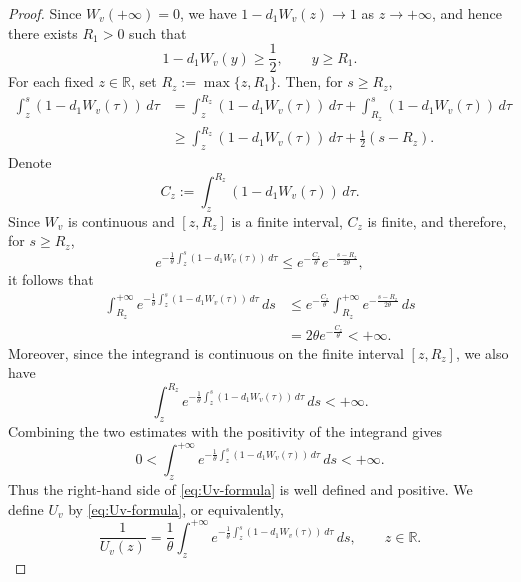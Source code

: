 \documentclass[10pt,a4paper]{amsart}
\begin{document}
\begin{proof}
Since $W_v(+\infty)=0$, we have $1-d_1W_v(z)\to1$ as $z\to+\infty$, and hence there exists $R_1>0$ such that
\begin{equation*}
1-d_1W_v(y)\ge\frac12,\qquad y\ge R_1.
\end{equation*}
For each fixed $z\in\mathbb R$, set $R_z:=\max\{z,R_1\}$. Then, for $s\ge R_z$,
\begin{align*}
\int_z^s(1-d_1W_v(\tau))\,d\tau
&=\int_z^{R_z}(1-d_1W_v(\tau))\,d\tau+
\int_{R_z}^s(1-d_1W_v(\tau))\,d\tau\\
&\ge \int_z^{R_z}(1-d_1W_v(\tau))\,d\tau
+\frac12(s-R_z).
\end{align*}
Denote
\begin{equation*}
C_z:=\int_z^{R_z}(1-d_1W_v(\tau))\,d\tau.
\end{equation*}
Since $W_v$ is continuous and $[z,R_z]$ is a finite interval, $C_z$ is finite, and therefore, for $s\ge R_z$,
\begin{equation*}
e^{-\frac{1}{\theta}\int_z^s(1-d_1W_v(\tau))\,d\tau}\le
e^{-\frac{C_z}{\theta}}e^{-\frac{s-R_z}{2\theta}},
\end{equation*}
it follows that
\begin{align*}
\int_{R_z}^{+\infty}e^{-\frac{1}{\theta}\int_z^s(1-d_1W_v(\tau))\,d\tau}\,ds
&\le e^{-\frac{C_z}{\theta}}\int_{R_z}^{+\infty}e^{-\frac{s-R_z}{2\theta}}\,ds\\
&=2\theta e^{-\frac{C_z}{\theta}}<+\infty.
\end{align*}
Moreover, since the integrand is continuous on the finite interval $[z,R_z]$, we also have
\begin{equation*}
\int_z^{R_z}e^{-\frac{1}{\theta}\int_z^s(1-d_1W_v(\tau))\,d\tau}\,ds<+\infty.
\end{equation*}
Combining the two estimates with the positivity of the integrand gives
\begin{equation*}
0<\int_z^{+\infty}e^{-\frac{1}{\theta}\int_z^s(1-d_1W_v(\tau))\,d\tau}\,ds<+\infty.
\end{equation*}
Thus the right-hand side of \eqref{eq:Uv-formula} is well defined and positive. We define $U_v$ by \eqref{eq:Uv-formula}, or equivalently,
\begin{equation}\label{eq:Uv-reciprocal-formula}
\frac{1}{U_v(z)}=\frac{1}{\theta}\int_z^{+\infty}e^{-\frac{1}{\theta}\int_z^s(1-d_1W_v(\tau))\,d\tau}\,ds,\qquad z\in\mathbb R.
\end{equation}


\end{proof}
\end{document}
